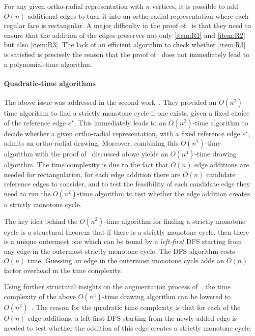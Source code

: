 \documentclass{article}\usepackage[a4paper,margin=20mm]{geometry}
\newcommand{\eref}{e^\star}
\begin{document}
For any given ortho-radial representation with $n$ vertices, it is possible to add $O(n)$ additional edges to turn it into an ortho-radial representation where each regular face is rectangular. A major difficulty in the proof of~\cite{barth2017} is that they need to ensure that the addition of the edges preserves not only \ref{item:R1} and \ref{item:R2} but also \ref{item:R3}.
The lack of an efficient algorithm to check whether \ref{item:R3} is satisfied is precisely the reason that the proof of~\cite{barth2017} does not immediately lead to a polynomial-time algorithm. 

\paragraph{Quadratic-time algorithms}
The above issue was addressed in the second work~\cite{niedermann19}. They provided an $O(n^2)$-time algorithm to find a strictly monotone cycle if one exists, given a fixed choice of the reference edge $\eref$. This immediately leads to an $O(n^2)$-time algorithm to decide whether a given ortho-radial representation, with a fixed reference edge $\eref$, admits an ortho-radial drawing. Moreover, combining this $O(n^2)$-time algorithm with the proof of~\cite{barth2017} discussed above yields an $O(n^4)$-time drawing algorithm. The time complexity is due to the fact that $O(n)$ edge additions are needed for rectangulation, for each edge addition there are $O(n)$ candidate reference edges to consider, and to test the feasibility of each candidate edge they need to run the  $O(n^2)$-time algorithm to test whether the edge addition creates a strictly monotone cycle.

The key idea behind the $O(n^2)$-time algorithm for finding a strictly monotone cycle is a structural theorem that if there is a strictly monotone cycle, then there is a unique outermost one which can be found by a \emph{left-first} DFS starting from any edge in the outermost strictly monotone cycle. The DFS algorithm costs $O(n)$ time. Guessing an edge in the outermost monotone cycle adds an $O(n)$ factor overhead in the time complexity.

Using further structural insights on the augmentation process of~\cite{barth2017}, the time complexity of the above $O(n^4)$-time drawing algorithm can be lowered to $O(n^2)$~\cite{niedermann19}. The reason for the quadratic time complexity is that for each of the $O(n)$ edge additions, a left-first DFS starting from the newly added edge is needed to test whether the addition of this edge creates a strictly monotone cycle. 
\end{document}
